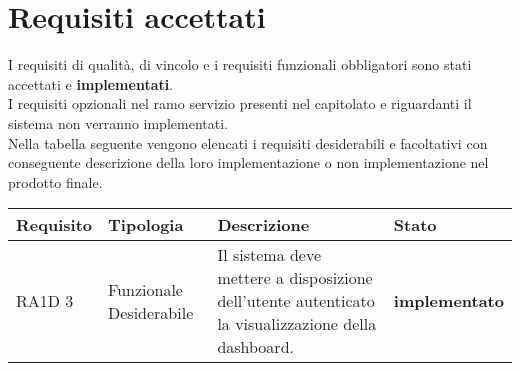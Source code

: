 \section{Requisiti accettati }
I requisiti di qualità, di vincolo e i requisiti funzionali obbligatori sono stati accettati e \textbf{{\color{green} implementati}}. \\
I requisiti opzionali nel ramo servizio presenti nel capitolato e riguardanti il sistema  non verranno implementati. \\
Nella tabella seguente vengono elencati i requisiti desiderabili e facoltativi con conseguente descrizione della loro implementazione o non implementazione nel prodotto finale.

      \bgroup
      \def\arraystretch{1.8}
      \begin{longtable}{ | l | p{2cm} | p{5cm} | p{4cm}| }
    
      \cellcolor[gray]{0.9} \textbf{Requisito} & \cellcolor[gray]{0.9} \textbf{Tipologia} 
      & \cellcolor[gray]{0.9} \textbf{Descrizione}  & \cellcolor[gray]{0.9} \textbf{Stato} \\ \hline
      
        
        RA1D 3 & Funzionale \newline  Desiderabile  & Il sistema deve mettere a disposizione dell'utente autenticato la visualizzazione della dashboard. & \textbf{{\color{green}implementato}} \newline \\ \hline      
            

\end{longtable}
